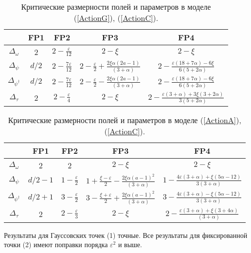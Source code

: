 \documentclass[a4paper,10pt]{article}
\begin{document}
\begin{table}[H]
\caption{Критические размерности полей и параметров в моделе (\protect\ref{ActionG}), (\protect\ref{ActionC}).}
\label{tableG}
\begin{tabular}{|c|c|c|c|c|}
\hline
{} & FP1 & FP2 & FP3 & FP4 \\ 
\hline
$\Delta_{\omega}$ & 2  & $2-\frac{\varepsilon}{12}$  & $2-\xi$ & $2-\xi$
\\ 
\hline
$\Delta_{\psi}$ & $d/2$  & $2-\frac{7\varepsilon}{12}$  &
$2-\frac{\varepsilon}{2}+\frac{2\xi\alpha(2a-1)}{(3+\alpha)}$ &
$2- \frac{\varepsilon(18+7\alpha)-6\xi}{6(5+2\alpha)}$ \\
 \hline
$\Delta_{\psi^{\dag}}$ & $d/2$  & $2-\frac{7\varepsilon}{12}$  &
$2-\frac{\varepsilon}{2}-\frac{2\xi\alpha(2a-1)}{(3+\alpha)}$    &
$2- \frac{\varepsilon(18+7\alpha)-6\xi}{6(5+2\alpha)}$ \\ 
\hline
$\Delta_{\tau}$ & 2  & $2-\frac{\varepsilon}{4}$ & $2-\xi$  &
$2- \frac{\varepsilon(3+\alpha) +3\xi(3+2\alpha)} {3(5+2\alpha)}$ \\ 
\hline
\end{tabular}
\end{table}

\begin{table}[H]
\caption{Критические размерности полей и параметров в моделе (\protect\ref{ActionA}), (\protect\ref{ActionC}).}
\label{tableA}
\begin{tabular}{|c|c|c|c|c|}
\hline
{} & FP1 & FP2 & FP3 & FP4 \\ 
\hline
$\Delta_{\omega}$ & 2  & 2  & $2-\xi$ & $2-\xi$ \\
\hline
$\Delta_{\psi}$ & $d/2-1$  & $1-\frac{\varepsilon}{2}$ &
$1+ \frac{\xi-\varepsilon}{2} - \frac{2\xi\alpha(a-1)^{2}} {(3+\alpha)}$ &
$1 - \frac{4\varepsilon(3+\alpha)+\xi(5\alpha-12)}{3(3+\alpha)}$ \\ 
\hline
$\Delta_{\psi^{\dag}}$ & $d/2+1$  & $3-\frac{\varepsilon}{2}$ &
$3- \frac{\xi+\varepsilon}{2} + \frac{2\xi\alpha(a-1)^{2}} {(3+\alpha)}$ &
$3 - \frac{4\varepsilon(3+\alpha)-\xi(5\alpha-12)}{3(3+\alpha)}$ \\ 
\hline
$\Delta_{\tau}$ & 2  & $2-\frac{\varepsilon}{3}$  &  $2-\xi$ &
$2- \frac{\varepsilon(3+\alpha)+\xi(3+4\alpha)}{(3+\alpha)}$ \\ 
\hline
\end{tabular}
\end{table}

Результаты для Гауссовских точек (1) точные. Все результаты для фиксированной точки (2) имеют поправки порядка   $\varepsilon^{2}$ и выше.
\end{document}
